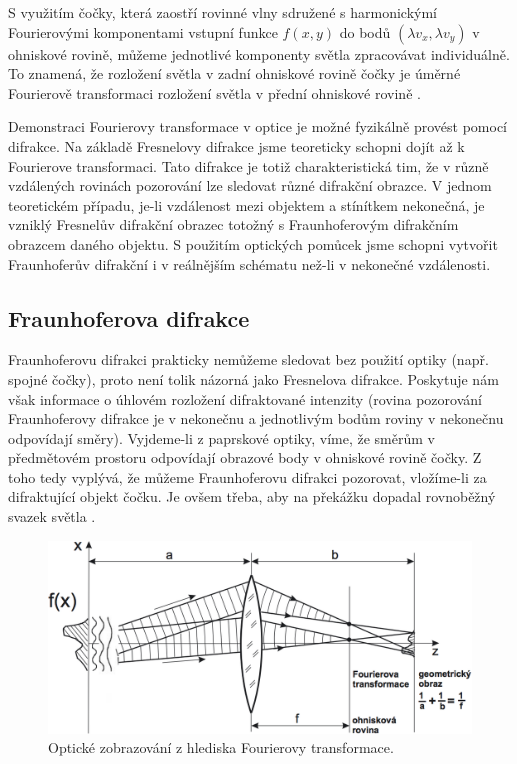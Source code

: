 \documentclass[11pt,a4paper]{article}
\begin{document}
S využitím čočky, která zaostří rovinné vlny sdružené s harmonickýmí Fourierovými komponentami
vstupní funkce $f(x,y)$ do bodů $(\lambda v_x, \lambda v_y)$ v ohniskové rovině, můžeme jednotlivé
komponenty světla zpracovávat individuálně. To znamená, že rozložení světla v zadní ohniskové 
rovině čočky je úměrné Fourierově transformaci rozložení světla v přední ohniskové rovině \cite{dipl1}.

Demonstraci Fourierovy transformace v optice je možné fyzikálně provést pomocí difrakce. Na základě
Fresnelovy difrakce jsme teoreticky schopni dojít až k Fourierove transformaci. Tato difrakce je totiž
charakteristická tim, že v různě vzdálených rovinách pozorování lze sledovat různé difrakční obrazce. V jednom
teoretickém případu, je-li vzdálenost mezi objektem a stínítkem nekonečná, je vzniklý Fresnelův difrakční 
obrazec totožný s Fraunhoferovým difrakčním obrazcem daného objektu. S použitím optických pomůcek
jsme schopni vytvořit Fraunhoferův difrakční i v reálnějším schématu než-li v nekonečné vzdálenosti.

\subsection{Fraunhoferova difrakce}
Fraunhoferovu difrakci prakticky nemůžeme sledovat bez použití optiky (např. spojné čočky), proto není tolik
názorná jako Fresnelova difrakce. Poskytuje nám však informace o úhlovém rozložení difraktované intenzity 
(rovina pozorování Fraunhoferovy difrakce je v nekonečnu a jednotlivým bodům roviny v nekonečnu odpovídají směry). 
Vyjdeme-li z paprskové optiky, víme, že směrům v předmětovém prostoru odpovídají obrazové 
body v ohniskové rovině čočky. Z toho tedy vyplývá, že můžeme Fraunhoferovu difrakci pozorovat, 
vložíme-li za difraktující objekt čočku. Je ovšem třeba, aby na překážku dopadal rovnoběžný svazek světla \cite{difrakce}.

\begin{figure}[H]
\centering
\includegraphics[width=14cm]{images/ft-cocka.png}
\caption{Optické zobrazování z hlediska Fourierovy transformace.}
\label{Fraunhofer}
\end{figure}
\end{document}
